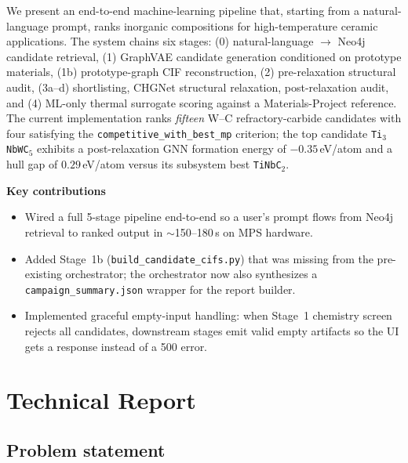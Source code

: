 \documentclass[11pt,a4paper]{report}
\newcommand{\eV}{eV/atom}
\begin{document}
We present an end-to-end machine-learning pipeline that, starting from a natural-language
prompt, ranks inorganic compositions for high-temperature ceramic applications. The system
chains six stages: (0) natural-language $\to$ Neo4j candidate retrieval, (1) GraphVAE
candidate generation conditioned on prototype materials, (1b) prototype-graph CIF
reconstruction, (2) pre-relaxation structural audit, (3a--d) shortlisting, CHGNet structural
relaxation, post-relaxation audit, and (4) ML-only thermal surrogate scoring against a
Materials-Project reference. The current implementation ranks
\textit{fifteen} W--C refractory-carbide candidates with four satisfying the
\texttt{competitive\_with\_best\_mp} criterion; the top candidate \texttt{Ti$_3$NbWC$_5$}
exhibits a post-relaxation GNN formation energy of $-0.35$\,\eV{} and a hull gap of
$0.29$\,\eV{} versus its subsystem best \texttt{TiNbC$_2$}.

\vspace{0.5em}
\noindent\textbf{Key contributions}
\begin{itemize}[leftmargin=*,itemsep=2pt]
\item Wired a full 5-stage pipeline end-to-end so a user's prompt flows from Neo4j
      retrieval to ranked output in $\sim$150--180\,s on MPS hardware.
\item Added Stage~1b (\texttt{build\_candidate\_cifs.py}) that was missing from the
      pre-existing orchestrator; the orchestrator now also synthesizes a
      \texttt{campaign\_summary.json} wrapper for the report builder.
\item Implemented graceful empty-input handling: when Stage~1 chemistry screen rejects
      all candidates, downstream stages emit valid empty artifacts so the UI gets a
      response instead of a 500 error.
\end{itemize}

\part{Technical Report}

\chapter{Problem statement}
\end{document}
